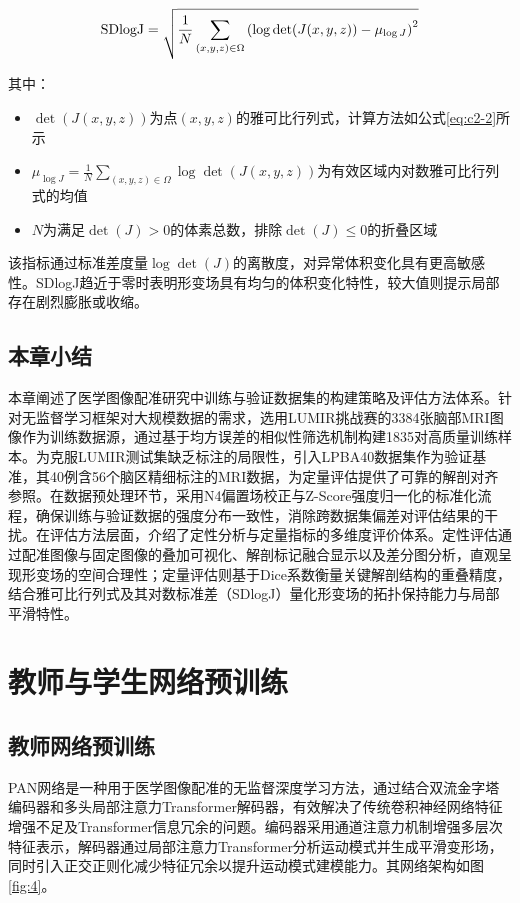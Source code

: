\begin{equation}
    \centering
    \text{SDlogJ} = \sqrt{ \frac{1}{N} \sum_{(x,y,z) \in \Omega} \left( \log \det(J(x,y,z)) - \mu_{\log J} \right)^2 }
    \label{eq:sdlogj}
\end{equation}

其中：
\begin{itemize}
    \item $\det(J(x,y,z))$为点$(x,y,z)$的雅可比行列式，计算方法如公式\ref{eq:c2-2}所示
    \item $\mu_{\log J} = \frac{1}{N} \sum_{(x,y,z) \in \Omega} \log \det(J(x,y,z))$为有效区域内对数雅可比行列式的均值
    \item $N$为满足$\det(J) > 0$的体素总数，排除$\det(J) \leq 0$的折叠区域
\end{itemize}

该指标通过标准差度量$\log \det(J)$的离散度，对异常体积变化具有更高敏感性。SDlogJ趋近于零时表明形变场具有均匀的体积变化特性，较大值则提示局部存在剧烈膨胀或收缩。

\section{本章小结}

本章阐述了医学图像配准研究中训练与验证数据集的构建策略及评估方法体系。针对无监督学习框架对大规模数据的需求，选用LUMIR挑战赛的3384张脑部MRI图像作为训练数据源，通过基于均方误差的相似性筛选机制构建1835对高质量训练样本。为克服LUMIR测试集缺乏标注的局限性，引入LPBA40数据集作为验证基准，其40例含56个脑区精细标注的MRI数据，为定量评估提供了可靠的解剖对齐参照。在数据预处理环节，采用N4偏置场校正与Z-Score强度归一化的标准化流程，确保训练与验证数据的强度分布一致性，消除跨数据集偏差对评估结果的干扰。在评估方法层面，介绍了定性分析与定量指标的多维度评价体系。定性评估通过配准图像与固定图像的叠加可视化、解剖标记融合显示以及差分图分析，直观呈现形变场的空间合理性；定量评估则基于Dice系数衡量关键解剖结构的重叠精度，结合雅可比行列式及其对数标准差（SDlogJ）量化形变场的拓扑保持能力与局部平滑特性。

\chapter{教师与学生网络预训练}

\section{教师网络预训练}


PAN网络是一种用于医学图像配准的无监督深度学习方法，通过结合双流金字塔编码器和多头局部注意力Transformer解码器，有效解决了传统卷积神经网络特征增强不足及Transformer信息冗余的问题。编码器采用通道注意力机制增强多层次特征表示，解码器通过局部注意力Transformer分析运动模式并生成平滑变形场，同时引入正交正则化减少特征冗余以提升运动模式建模能力。其网络架构如图\ref{fig:4}。

